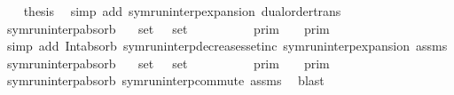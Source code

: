 \begin{isabellebody}
\isanewline
\ \ \isamarkupfalse%
\ {\isacharquery}thesis\ \isamarkupfalse%
\ {\isacharparenleft}simp\ add{\isacharcolon}\ symrun{\isacharunderscore}interp{\isacharunderscore}expansion\ dual{\isacharunderscore}order{\isachardot}trans{\isacharparenright}\isanewline
{}\isamarkupfalse%
%
\endisatagproof
{\isafoldproof}%
%
\isadelimproof
\isanewline
%
\endisadelimproof
\isanewline
{}\isamarkupfalse%
\ symrun{\isacharunderscore}interp{\isacharunderscore}absorb{}{\isacharcolon}\isanewline
\ \ \ {\isacartoucheopen}set\ {\isasymGamma}\ {\isasymsubseteq}\ set\ {\isasymGamma}\isanewline
\ \ \ \ \ {\isacartoucheopen}{\isasymlbrakk}{\isasymlbrakk}\ {\isasymGamma}\ {\isacharat}\ {\isasymGamma}\ {\isasymrbrakk}{\isasymrbrakk}\isactrlsub p\isactrlsub r\isactrlsub i\isactrlsub m\ {\isacharequal}\ {\isasymlbrakk}{\isasymlbrakk}\ {\isasymGamma}\ {\isasymrbrakk}{\isasymrbrakk}\isactrlsub p\isactrlsub r\isactrlsub i\isactrlsub m{\isacartoucheclose}\isanewline
%
\isadelimproof
%
\endisadelimproof
%
\isatagproof
{}\isamarkupfalse%
\ {\isacharparenleft}simp\ add{\isacharcolon}\ Int{\isacharunderscore}absorb{}\ symrun{\isacharunderscore}interp{\isacharunderscore}decreases{\isacharunderscore}setinc\ symrun{\isacharunderscore}interp{\isacharunderscore}expansion\ assms{\isacharparenright}%
\endisatagproof
{\isafoldproof}%
%
\isadelimproof
\isanewline
%
\endisadelimproof
\isanewline
{}\isamarkupfalse%
\ symrun{\isacharunderscore}interp{\isacharunderscore}absorb{}{\isacharcolon}\isanewline
\ \ \ {\isacartoucheopen}set\ {\isasymGamma}\ {\isasymsubseteq}\ set\ {\isasymGamma}\isanewline
\ \ \ \ \ {\isacartoucheopen}{\isasymlbrakk}{\isasymlbrakk}\ {\isasymGamma}\ {\isacharat}\ {\isasymGamma}\ {\isasymrbrakk}{\isasymrbrakk}\isactrlsub p\isactrlsub r\isactrlsub i\isactrlsub m\ {\isacharequal}\ {\isasymlbrakk}{\isasymlbrakk}\ {\isasymGamma}\ {\isasymrbrakk}{\isasymrbrakk}\isactrlsub p\isactrlsub r\isactrlsub i\isactrlsub m{\isacartoucheclose}\isanewline
%
\isadelimproof
%
\endisadelimproof
%
\isatagproof
{}\isamarkupfalse%
\ symrun{\isacharunderscore}interp{\isacharunderscore}absorb{}\ symrun{\isacharunderscore}interp{\isacharunderscore}commute\ assms\ \isamarkupfalse%
\ blast%
\endisatagproof
{\isafoldproof}%
%
\isadelimproof
\isanewline
%
\endisadelimproof
%
\isadelimtheory
\isanewline
%
\endisadelimtheory
%
\isatagtheory
{}\isamarkupfalse%
%
\endisatagtheory
{\isafoldtheory}%
%
\isadelimtheory
%
\endisadelimtheory
%
\end{isabellebody}%
